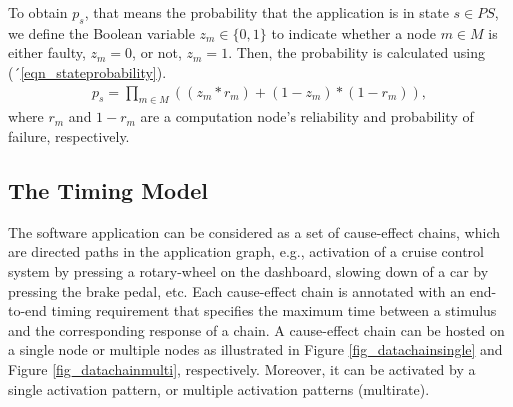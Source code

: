 To obtain $p_s$, that means the probability that the application is in state $s\in PS$, we define the Boolean variable $z_m \in \{0,1\}$ to indicate whether a node $m \in M$ is either faulty, $z_m = 0$, or not, $z_m = 1$. Then, the probability is calculated using (´\ref{eqn_stateprobability}).
\begin{align}
\label{eqn_stateprobability}
p_s=\prod_{m\in M}((z_m*r_m) + (1-z_m)*(1-r_m)),
\end{align}
where $r_m$ and $1-r_m$ are a computation node's reliability and probability of failure, respectively.

\subsection{The Timing Model}
The software application can be considered as a set of cause-effect chains, which are directed paths in the application graph, e.g.,  activation of a cruise control system by pressing a rotary-wheel on the dashboard, slowing down of a car by pressing the brake pedal, etc. Each cause-effect chain is annotated with an end-to-end timing requirement that specifies the maximum time between a stimulus and the corresponding response of a chain. A cause-effect chain can be hosted on a single node or multiple nodes as illustrated in Figure \ref{fig_datachainsingle} and Figure \ref{fig_datachainmulti}, respectively. Moreover, it can be activated by a single activation pattern, or multiple activation patterns (multirate).

